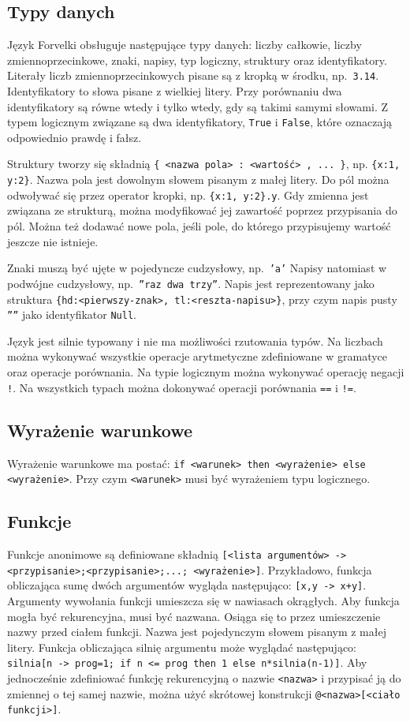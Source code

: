 \documentclass[4paper,10pt]{article}
\begin{document}
\subsection{Typy danych}
Język Forvelki obsługuje następujące typy danych: liczby całkowie, liczby zmiennoprzecinkowe, znaki, napisy, typ logiczny, struktury oraz identyfikatory.
Literały liczb zmiennoprzecinkowych pisane są z kropką w środku, np.~\texttt{3.14}.
Identyfikatory to słowa pisane z wielkiej litery.
Przy porównaniu dwa identyfikatory są równe wtedy i tylko wtedy, gdy są takimi samymi słowami.
Z typem logicznym związane są dwa identyfikatory, \texttt{True} i \texttt{False}, które oznaczają odpowiednio prawdę i fałsz.

Struktury tworzy się składnią \texttt{\{ <nazwa pola> : <wartość> , ... \}}, np. \texttt{\{x:1, y:2\}}.
Nazwa pola jest dowolnym słowem pisanym z małej litery.
Do pól można odwoływać się przez operator kropki, np. \texttt{\{x:1,~y:2\}.y}.
Gdy zmienna jest związana ze strukturą, można modyfikować jej zawartość poprzez przypisania do pól.
Można też dodawać nowe pola, jeśli pole, do którego przypisujemy wartość jeszcze nie istnieje.

Znaki muszą być ujęte w pojedyncze cudzysłowy, np.~\texttt{'a'}
Napisy natomiast w podwójne cudzysłowy, np.~\texttt{''raz dwa trzy''}.
Napis jest reprezentowany jako struktura \texttt{\{hd:<pierwszy-znak>,~tl:<reszta-napisu>\}}, przy czym napis pusty \texttt{''''} jako identyfikator \texttt{Null}.

Język jest silnie typowany i nie ma możliwości rzutowania typów.
Na liczbach można wykonywać wszystkie operacje arytmetyczne zdefiniowane w gramatyce oraz operacje porównania.
Na typie logicznym można wykonywać operację negacji \texttt{!}.
Na wszystkich typach można dokonywać operacji porównania \texttt{==} i \texttt{!=}.

\subsection{Wyrażenie warunkowe}
Wyrażenie warunkowe ma postać:
\texttt{if <warunek> then <wyrażenie> else <wyrażenie>}.
Przy czym \texttt{<warunek>} musi być wyrażeniem typu logicznego.

\subsection{Funkcje}
Funkcje anonimowe są definiowane składnią \texttt{[<lista argumentów> -> <przypisanie>;<przypisanie>;...; <wyrażenie>]}.
Przykładowo, funkcja obliczająca sumę dwóch argumentów wygląda następująco: \texttt{[x,y~->~x+y]}.
Argumenty wywołania funkcji umieszcza się w nawiasach okrągłych.
Aby funkcja mogła być rekurencyjna, musi być nazwana.
Osiąga się to przez umieszczenie nazwy przed ciałem funkcji.
Nazwa jest pojedynczym słowem pisanym z małej litery.
Funkcja obliczająca silnię argumentu może wyglądać następująco: \texttt{silnia[n -> prog=1; if n <= prog then 1 else n*silnia(n-1)]}.
Aby jednocześnie zdefiniować funkcję rekurencyjną o nazwie \texttt{<nazwa>} i przypisać ją do zmiennej o tej samej nazwie, można użyć skrótowej konstrukcji \texttt{@<nazwa>[<ciało funkcji>]}.
\end{document}
